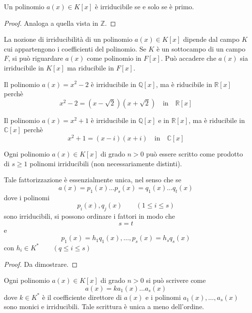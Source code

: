 \documentclass[a4paper,12pt, oneside]{book}
\begin{document}
\begin{teorema}
	Un polinomio $a(x) \in K[x]$ è irriducibile se e solo se è primo.

	\begin{proof}
		Analoga a quella vista in $\mathbb{Z}$.
	\end{proof}
\end{teorema}

\begin{osservazione}
	La nozione di irriducibilità di un polinomio $a(x) \in K[x]$ dipende dal campo $K$ cui appartengono i coefficienti del polinomio.
	Se $K$ è un sottocampo di un campo $F$, si può riguardare $a(x)$ come polinomio in $F[x]$. Può accadere che $a(x)$ sia irriducibile in $K[x]$ ma riducibile in $F[x]$.
\end{osservazione}

\begin{shaded}
	\begin{esempio}
		Il polinomio $a(x) = x^2 -2$ è irriducibile in $\mathbb{Q}[x]$, ma è riducibile in $\mathbb{R}[x]$ perchè
		$$x^2 -2 = (x-\sqrt{2}) (x+\sqrt{2}) \quad \mbox{in} \quad \mathbb{R}[x]$$
	\end{esempio}
	\begin{esempio}
		Il polinomio $a(x) = x^2 +1$ è irriducibile in $\mathbb{Q}[x]$ e in $\mathbb{R}[x]$, ma è riducibile in $\mathbb{C}[x]$ perchè
		$$x^2 +1 = (x-i) (x+i) \quad \mbox{in} \quad \mathbb{C}[x]$$
	\end{esempio}
\end{shaded}

\begin{teorema}
	Ogni polinomio $a(x) \in K[x]$ di grado $n>0$ può essere scritto come prodotto di $s \geq 1$ polinomi irriducibili (non necessariamente distinti).

	Tale fattorizzazione è essenzialmente unica, nel senso che se
	$$a(x) = p_1(x) \dots p_s(x) = q_1(x) \dots q_t(x)$$ dove i polinomi
	$$p_i(x), q_j(x) \qquad (1 \leq i \leq s)$$ sono irriducibili, si possono ordinare i fattori in modo che $$s=t$$ e
	$$p_1(x) = h_1q_1(x), \dots , p_s(x) = h_sq_s(x)$$
	con $h_i \in K^{*} \qquad (q \leq i \leq s)$

	\begin{proof}
		Da dimostrare. %
	\end{proof}
\end{teorema}

\begin{corollario}
	Ogni polinomio $a(x) \in K[x]$ di grado $n>0$ si può scrivere come
	$$a(x) = ka_1(x) \dots a_s(x)$$
	dove $k \in K^{*}$ è il coefficiente direttore di $a(x)$ e i polinomi $a_1(x), \dots, a_s(x)$ sono monici e irriducibili. Tale scrittura è unica a meno dell'ordine.
\end{corollario}
\end{document}
